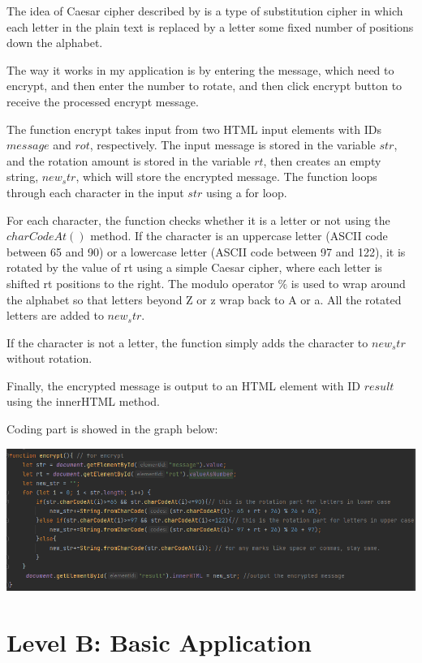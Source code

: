 \documentclass[a4paper, 11pt]{report}
\begin{document}
The idea of Caesar cipher described by \cite{caesar} is a type of substitution cipher in which each letter in the plain text is replaced by a letter some fixed number of positions down the alphabet.

The way it works in my application is by entering the message, which need to encrypt, and then enter the number to rotate, and then click encrypt button to receive the processed encrypt message.

The function encrypt takes input from two HTML input elements with IDs $message$ and $rot$, respectively. The input message is stored in the variable $str$, and the rotation amount is stored in the variable $rt$, then creates an empty string, $new_str$, which will store the encrypted message. The function loops through each character in the input $str$ using a for loop.

For each character, the function checks whether it is a letter or not using the $charCodeAt()$ method. If the 
character is an uppercase letter (ASCII code between 65 and 90) or a lowercase letter (ASCII code between 97 and 
122), it is rotated by the value of rt using a simple Caesar cipher, where each letter is shifted rt positions to 
the right. 
The modulo operator $\%$ is used to wrap around the alphabet so that letters beyond Z or z wrap back to A or a. All the rotated letters are added to $new_str$.

If the character is not a letter, the function simply adds the character to $new_str$ without rotation.

Finally, the encrypted message is output to an HTML element with ID $result$ using the innerHTML method.

Coding part is showed in the graph below:

\includegraphics[width=14cm]{screengrabs/JavaScript encrypt.png}


\newpage
\section{Level B: Basic Application}
\end{document}
